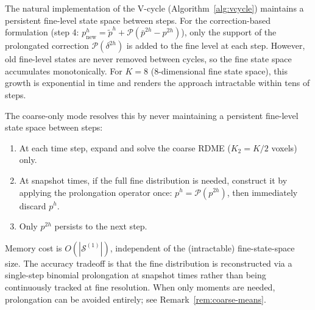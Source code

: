\documentclass[review,onefignum,onetabnum]{siamart171218}
\newcommand{\calP}{\mathcal{P}}
\newcommand{\calS}{\mathcal{S}}
\begin{document}
\begin{remark}
  \label{rem:coarse-only}
  The natural implementation of the V-cycle (Algorithm~\ref{alg:vcycle})
  maintains a persistent fine-level state space between steps.  For the
  correction-based formulation (step 4: $p^h_{\mathrm{new}} = \tilde{p}^h
  + \calP(\bar{p}^{2h} - p^{2h})$), only the support of the
  prolongated correction $\calP(\delta^{2h})$ is added to the fine level
  at each step.  However, old fine-level states are never removed between
  cycles, so the fine state space accumulates monotonically.
  For $K = 8$ (8-dimensional fine state space), this growth is
  exponential in time and renders the approach intractable within tens
  of steps.

  The coarse-only mode resolves this by never maintaining a persistent
  fine-level state space between steps:
  \begin{enumerate}
    \item At each time step, expand and solve the coarse RDME
      ($K_2 = K/2$ voxels) only.
    \item At snapshot times, if the full fine distribution is needed,
      construct it by applying the prolongation operator once:
      $p^h = \calP(p^{2h})$, then immediately discard $p^h$.
    \item Only $p^{2h}$ persists to the next step.
  \end{enumerate}
  Memory cost is $O(|\calS^{(1)}|)$, independent of the (intractable)
  fine-state-space size.  The accuracy tradeoff is that the fine
  distribution is reconstructed via a single-step binomial prolongation
  at snapshot times rather than being continuously tracked at fine
  resolution.  When only moments are needed, prolongation can be
  avoided entirely; see Remark~\ref{rem:coarse-means}.
\end{remark}
\end{document}
